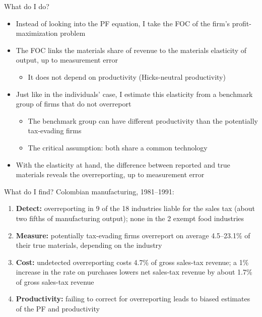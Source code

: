 \documentclass[
  ignorenonframetext,
  aspectratio=169,
]{beamer}
\newcounter{none} %
\providecommand{\tightlist}{%
  \setlength{\itemsep}{0pt}\setlength{\parskip}{0pt}}
\begin{document}
\begin{frame}{What do I do?}
\protect{}\label{what-do-i-do}
\begin{itemize}
\tightlist
\item
  Instead of looking into the PF equation, I take the FOC of the firm's
  profit-maximization problem
\item
  The FOC links the materials share of revenue to the materials
  elasticity of output, up to measurement error

  \begin{itemize}
  \tightlist
  \item
    It does not depend on productivity (Hicks-neutral productivity)
  \end{itemize}
\item
  Just like in the individuals' case, I estimate this elasticity from a
  benchmark group of firms that do not overreport

  \begin{itemize}
  \tightlist
  \item
    The benchmark group can have different productivity than the
    potentially tax-evading firms
  \item
    The critical assumption: both share a common technology
  \end{itemize}
\item
  With the elasticity at hand, the difference between reported and true
  materials reveals the overreporting, up to measurement error
\end{itemize}
\end{frame}

\begin{frame}{What do I find?}
\protect{}\label{what-do-i-find}
Colombian manufacturing, 1981--1991:

\begin{enumerate}
\tightlist
\item
  \textbf{Detect:} overreporting in 9 of the 18 industries liable for
  the sales tax (about two fifths of manufacturing output); none in the
  2 exempt food industries
\item
  \textbf{Measure:} potentially tax-evading firms overreport on average
  4.5--23.1\% of their true materials, depending on the industry
\item
  \textbf{Cost:} undetected overreporting costs 4.7\% of gross sales-tax
  revenue; a 1\% increase in the rate on purchases lowers net sales-tax
  revenue by about 1.7\% of gross sales-tax revenue
\item
  \textbf{Productivity:} failing to correct for overreporting leads to
  biased estimates of the PF and productivity
\end{enumerate}
\end{frame}
\end{document}

